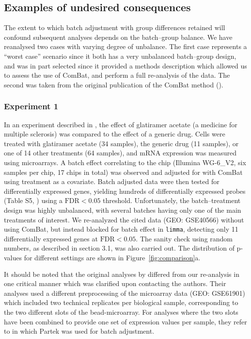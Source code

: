 \documentclass{bio}
\begin{document}
\subsection{Examples of undesired consequences}

The extent to which batch adjustment with group differences retained will confound subsequent analyses depends on the batch--group balance. We have reanalysed two cases with varying degree of unbalance. The first case represents a ``worst case'' scenario since it both has a very unbalanced batch--group design, and was in part selected since it provided a methods description which allowed us to assess the use of ComBat, and perform a full re-analysis of the data. The second was taken from the original publication of the ComBat method (\citealp{Johnson2007}).

\subsubsection{Experiment 1}

In an experiment described in \citet{Towfic2014}, the effect of glatiramer acetate (a medicine for multiple sclerosis) was compared to the effect of a generic drug. Cells were treated with glatiramer acetate (34 samples), the generic drug (11 samples), or one of 14 other treatments (64 samples), and mRNA expression was measured using microarrays. A batch effect correlating to the chip (Illumina WG-6\_V2, six samples per chip, 17 chips in total) was observed and adjusted for with ComBat using treatment as a covariate. Batch adjusted data were then tested for differentially expressed genes, yielding hundreds of differentially expressed probes (Table S5, \citealp{Towfic2014}) using a $\text{FDR}<0.05$ threshold. Unfortunately, the batch--treatment design was highly unbalanced, with several batches having only one of the main treatments of interest. We re-analyzed the cited data (GEO: GSE40566) without using ComBat, but instead blocked for batch effect in \texttt{limma}, detecting only 11 differentially expressed genes at $\text{FDR}<0.05$. The sanity check using random numbers, as described in section 3.1, was also carried out. The distribution of p-values for different settings are shown in Figure~\ref{fig:comparison}a.

It should be noted that the original analyses by \citet{Towfic2014} differed from our re-analysis in one critical manner which was clarified upon contacting the authors. Their analyses used a different preprocessing of the microarray data (GEO: GSE61901) which included two technical replicates per biological sample, corresponding to the two different slots of the bead-microarray. For analyses where the two slots have been combined to provide one set of expression values per sample, they refer to \citet{Bakshi2013} in which Partek was used for batch adjustment.
\end{document}
